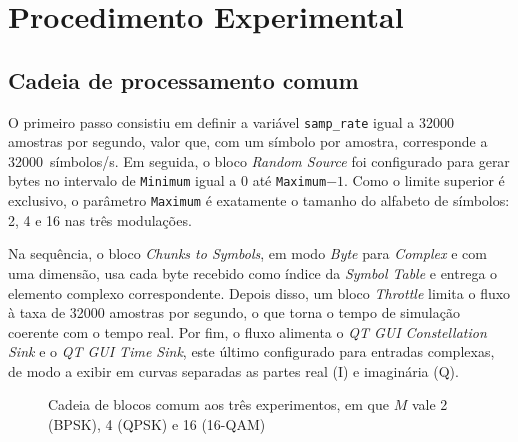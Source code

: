 \documentclass[12pt,a4paper]{article}
\newcommand{\fonte}[1]{\par\vspace{2pt}{\small Fonte: #1}\par}
\begin{document}
\section{Procedimento Experimental}\label{sec:proc}

\subsection{Cadeia de processamento comum}

O primeiro passo consistiu em definir a variável \texttt{samp\_rate} igual a \SI{32000}{} amostras por segundo, valor que, com um símbolo por amostra, corresponde a \num{32000}~símbolos/s. Em seguida, o bloco \textit{Random Source} foi configurado para gerar bytes no intervalo de \texttt{Minimum} igual a 0 até \texttt{Maximum}$-1$. Como o limite superior é exclusivo, o parâmetro \texttt{Maximum} é exatamente o tamanho do alfabeto de símbolos: 2, 4 e 16 nas três modulações.

Na sequência, o bloco \textit{Chunks to Symbols}, em modo \textit{Byte} para \textit{Complex} e com uma dimensão, usa cada byte recebido como índice da \textit{Symbol Table} e entrega o elemento complexo correspondente. Depois disso, um bloco \textit{Throttle} limita o fluxo à taxa de \SI{32000}{} amostras por segundo, o que torna o tempo de simulação coerente com o tempo real. Por fim, o fluxo alimenta o \textit{QT GUI Constellation Sink} e o \textit{QT GUI Time Sink}, este último configurado para entradas complexas, de modo a exibir em curvas separadas as partes real (I) e imaginária (Q).

\begin{figure}[H]
\centering
{}
\caption{Cadeia de blocos comum aos três experimentos, em que $M$ vale 2 (BPSK), 4 (QPSK) e 16 (16-QAM)}
\fonte{elaborado pelo autor.}
\end{figure}
\end{document}
